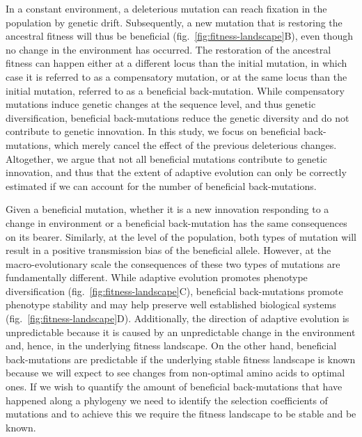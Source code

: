 In a constant environment, a deleterious mutation can reach fixation in the population by genetic drift\cite{Ohta1992}.
Subsequently, a new mutation that is restoring the ancestral fitness will thus be beneficial (fig.~\ref{fig:fitness-landscape}B), even though no change in the environment has occurred\cite{hartl_compensatory_1996, sella_application_2005, mustonen_fitness_2009, cvijovic_fate_2015}.
The restoration of the ancestral fitness can happen either at a different locus than the initial mutation, in which case it is referred to as a compensatory mutation\cite{hartl_compensatory_1996, mustonen_fitness_2009}, or at the same locus than the initial mutation, referred to as a beneficial back-mutation\cite{piganeau_estimating_2003, charlesworth_other_2007}.
While compensatory mutations induce genetic changes at the sequence level, and thus genetic diversification, beneficial back-mutations reduce the genetic diversity and do not contribute to genetic innovation.
In this study, we focus on beneficial back-mutations, which merely cancel the effect of the previous deleterious changes.
Altogether, we argue that not all beneficial mutations contribute to genetic innovation, and thus that the extent of adaptive evolution can only be correctly estimated if we can account for the number of beneficial back-mutations\cite{keightley_what_2010, rice_evolutionarily_2015}.

Given a beneficial mutation, whether it is a new innovation responding to a change in environment or a beneficial back-mutation has the same consequences on its bearer\cite{charlesworth_other_2007}.
Similarly, at the level of the population, both types of mutation will result in a positive transmission bias of the beneficial allele.
However, at the macro-evolutionary scale the consequences of these two types of mutations are fundamentally different.
While adaptive evolution promotes phenotype diversification (fig.~\ref{fig:fitness-landscape}C), beneficial back-mutations promote phenotype stability and may help preserve well established biological systems (fig.~\ref{fig:fitness-landscape}D).
Additionally, the direction of adaptive evolution is unpredictable because it is caused by an unpredictable change in the environment and, hence, in the underlying fitness landscape\cite{bazykin_changing_2015}.
On the other hand, beneficial back-mutations are predictable if the underlying stable fitness landscape is known because we will expect to see changes from non-optimal amino acids to optimal ones.
If we wish to quantify the amount of beneficial back-mutations that have happened along a phylogeny we need to identify the selection coefficients of mutations and to achieve this we require the fitness landscape to be stable and be known.

